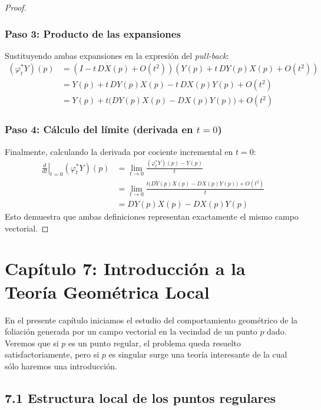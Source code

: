 \documentclass[11pt,a4paper]{article}
\theoremstyle{definition}
\theoremstyle{plain}
\theoremstyle{remark}
\begin{document}
\begin{proof}
		\subsubsection*{Paso 3: Producto de las expansiones}
		Sustituyendo ambas expansiones en la expresión del \textit{pull-back}:
		\[
		\begin{aligned}
			(\varphi_t^* Y)(p) &= \left( I - t \, DX(p) + O(t^2) \right) \left( Y(p) + t \, DY(p) X(p) + O(t^2) \right) \\
			&= Y(p) + t \, DY(p) X(p) - t \, DX(p) Y(p) + O(t^2) \\
			&= Y(p) + t \Big( DY(p) X(p) - DX(p) Y(p) \Big) + O(t^2)
		\end{aligned}
		\]
		
		\subsubsection*{Paso 4: Cálculo del límite (derivada en $t=0$)}
		Finalmente, calculando la derivada por cociente incremental en $t=0$:
		\[
		\begin{aligned}
			\left. \frac{d}{dt} \right|_{t=0} (\varphi_t^* Y)(p) &= \lim_{t \to 0} \frac{(\varphi_t^* Y)(p) - Y(p)}{t} \\
			&= \lim_{t \to 0} \frac{t \Big( DY(p) X(p) - DX(p) Y(p) \Big) + O(t^2)}{t} \\
			&= DY(p) X(p) - DX(p) Y(p)
		\end{aligned}
		\]
		Esto demuestra que ambas definiciones representan exactamente el mismo campo vectorial.
	\end{proof}
	
	\section*{Capítulo 7: Introducción a la Teoría Geométrica Local}
	
	En el presente capítulo iniciamos el estudio del comportamiento geométrico de la foliación generada por un campo vectorial en la vecindad de un punto $p$ dado. Veremos que si $p$ es un punto regular, el problema queda resuelto satisfactoriamente, pero si $p$ es singular surge una teoría interesante de la cual sólo haremos una introducción.
	
	\subsection*{7.1 Estructura local de los puntos regulares}
	
\end{document}
